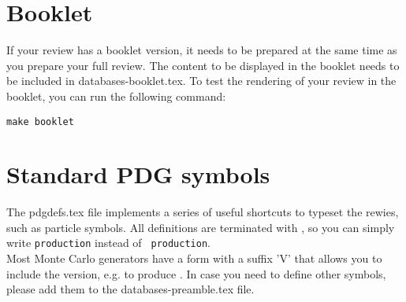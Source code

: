 \section{Booklet}

If your review has a booklet version, it needs to be prepared at the same time as you prepare your full review.
The content to be displayed in the booklet needs to be included in databases-booklet.tex. 
To test the rendering of your review in the booklet, you can run the following command:
\begin{verbatim}
make booklet
\end{verbatim}





\section{Standard PDG symbols}

The pdgdefs.tex file implements a series of useful shortcuts to typeset the rewies, such as particle symbols. 
All definitions are terminated with  \texttt{\string\xspace} , so you can simply write  \texttt{\string\ttbar} \texttt{production} instead of  \texttt{\string\ttbar \string\ production}.\\
Most Monte Carlo generators have a form with a suffix 'V' that allows you to include the version, e.g. \texttt{\string{}} to produce \texttt{}.
In case you need to define other symbols, please add them to the databases-preamble.tex file.


